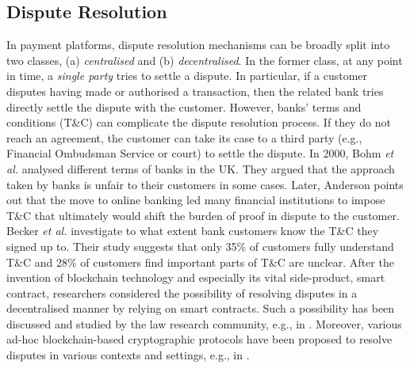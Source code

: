 \subsection{Dispute Resolution}
 \vspace{-1mm}
In payment platforms,  dispute resolution mechanisms can be broadly split into two classes, (a) \emph{centralised} and (b) \emph{decentralised}. In the former class,  at any point in time, a \emph{single party} tries to settle a dispute. In particular, if a customer disputes having made or authorised a transaction, then the related bank tries directly settle the dispute with the customer.  However,  banks' terms and conditions (T\&C) can complicate the dispute resolution process. If they do not reach an agreement, the customer can take its case to a third party (e.g., Financial Ombudsman Service or court) to settle the dispute. In 2000, Bohm \textit{et al.} \cite{BohmBG00} analysed different terms of banks in the UK. They argued that the approach taken by banks is unfair to their customers in some cases. Later,  Anderson  \cite{anderson2007closing} points out that the move to online banking led many financial institutions to impose T\&C  that ultimately would shift the burden of proof in dispute to the customer.    Becker \textit{et al.} \cite{BeckerHAABMSS17} investigate to what extent bank customers know the  T\&C they signed up to. Their study suggests that only 35\% of customers fully understand T\&C and  28\% of customers find important parts of T\&C are unclear.  After the invention of blockchain technology and especially its vital side-product, smart contract, researchers considered the possibility of resolving disputes in a decentralised manner by relying on smart contracts. Such a possibility has been discussed and studied by the law research community, e.g., in \cite{buchwald2019smart,ortolani2016self,ortolani2019impact}. Moreover,  various ad-hoc blockchain-based cryptographic protocols have been  proposed to resolve disputes in various contexts and settings, e.g., in \cite{DziembowskiEF18,EckeyFS20,Lightning-Network,Bolt,cryptoeprint:2021:1145}. 



